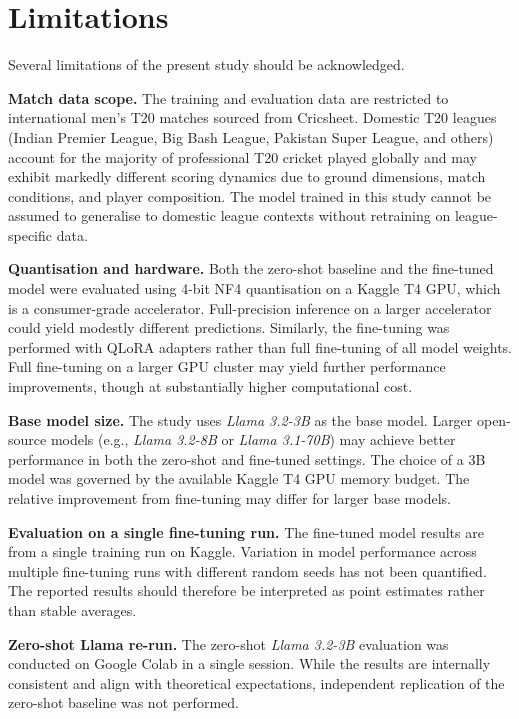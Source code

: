 \section{Limitations}

Several limitations of the present study should be acknowledged.

\textbf{Match data scope.} The training and evaluation data are restricted to international men's T20 matches sourced from Cricsheet. Domestic T20 leagues (Indian Premier League, Big Bash League, Pakistan Super League, and others) account for the majority of professional T20 cricket played globally and may exhibit markedly different scoring dynamics due to ground dimensions, match conditions, and player composition. The model trained in this study cannot be assumed to generalise to domestic league contexts without retraining on league-specific data.

\textbf{Quantisation and hardware.} Both the zero-shot baseline and the fine-tuned model were evaluated using 4-bit NF4 quantisation on a Kaggle T4 GPU, which is a consumer-grade accelerator. Full-precision inference on a larger accelerator could yield modestly different predictions. Similarly, the fine-tuning was performed with QLoRA adapters rather than full fine-tuning of all model weights. Full fine-tuning on a larger GPU cluster may yield further performance improvements, though at substantially higher computational cost.

\textbf{Base model size.} The study uses \textit{Llama 3.2-3B} as the base model. Larger open-source models (e.g., \textit{Llama 3.2-8B} or \textit{Llama 3.1-70B}) may achieve better performance in both the zero-shot and fine-tuned settings. The choice of a 3B model was governed by the available Kaggle T4 GPU memory budget. The relative improvement from fine-tuning may differ for larger base models.

\textbf{Evaluation on a single fine-tuning run.} The fine-tuned model results are from a single training run on Kaggle. Variation in model performance across multiple fine-tuning runs with different random seeds has not been quantified. The reported results should therefore be interpreted as point estimates rather than stable averages.

\textbf{Zero-shot Llama re-run.} The zero-shot \textit{Llama 3.2-3B} evaluation was conducted on Google Colab in a single session. While the results are internally consistent and align with theoretical expectations, independent replication of the zero-shot baseline was not performed.

